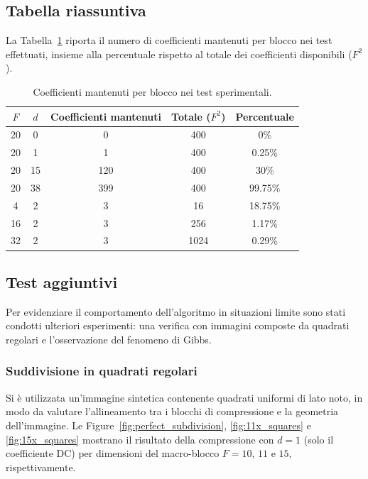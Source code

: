 \documentclass[12pt,a4paper]{article}
\begin{document}
\subsection{Tabella riassuntiva}

La Tabella~\ref{tab:results} riporta il numero di coefficienti mantenuti per
blocco nei test effettuati, insieme alla percentuale rispetto al totale dei
coefficienti disponibili ($F^2$).

\begin{table}[H]
\centering
\caption{Coefficienti mantenuti per blocco nei test sperimentali.}
\label{tab:results}
\begin{tabular}{ccccc}
\toprule
$F$ & $d$ & Coefficienti mantenuti & Totale ($F^2$) & Percentuale \\
\midrule
20 & 0  &   0   & 400  &   0\% \\
20 & 1  &   1   & 400  &   0.25\% \\
20 & 15 & 120   & 400  &  30\% \\
20 & 38 & 399   & 400  &  99.75\% \\
\midrule
4  & 2  &   3   & 16   &  18.75\% \\
16 & 2  &   3   & 256  &  1.17\% \\
32 & 2  &   3   & 1024 &  0.29\% \\
\bottomrule
\end{tabular}
\end{table}

\subsection{Test aggiuntivi}
\label{sec:test_aggiuntivi}

Per evidenziare il comportamento dell'algoritmo in situazioni limite sono stati
condotti ulteriori esperimenti: una verifica con immagini composte da quadrati
regolari e l'osservazione del fenomeno di Gibbs.

\subsubsection{Suddivisione in quadrati regolari}

Si è utilizzata un'immagine sintetica contenente quadrati uniformi di lato noto,
in modo da valutare l'allineamento tra i blocchi di compressione e la geometria
dell'immagine. Le Figure~\ref{fig:perfect_subdivision}, \ref{fig:11x_squares} e
\ref{fig:15x_squares} mostrano il risultato della compressione con $d=1$
(solo il coefficiente DC) per dimensioni del macro-blocco $F = 10$, $11$ e $15$,
rispettivamente.
\end{document}
